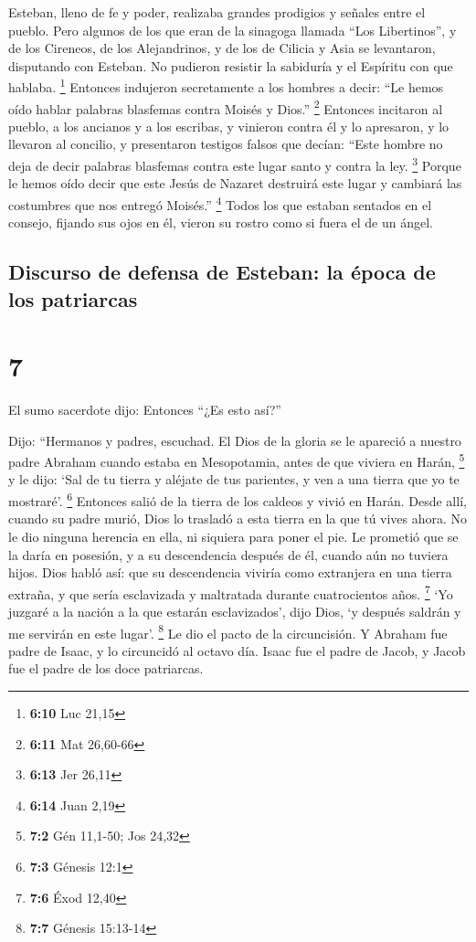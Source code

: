 Esteban, lleno de fe y poder, realizaba grandes prodigios
y señales entre el pueblo.  Pero algunos de los que eran
de la sinagoga llamada ``Los Libertinos'', y de los Cireneos, de los
Alejandrinos, y de los de Cilicia y Asia se levantaron, disputando con
Esteban.  No pudieron resistir la sabiduría y el Espíritu
con que hablaba. \footnote{\textbf{6:10} Luc 21,15} 
Entonces indujeron secretamente a los hombres a decir: ``Le hemos oído
hablar palabras blasfemas contra Moisés y Dios.'' \footnote{\textbf{6:11}
  Mat 26,60-66}  Entonces incitaron al pueblo, a los
ancianos y a los escribas, y vinieron contra él y lo apresaron, y lo
llevaron al concilio,  y presentaron testigos falsos que
decían: ``Este hombre no deja de decir palabras blasfemas contra este
lugar santo y contra la ley. \footnote{\textbf{6:13} Jer 26,11}
 Porque le hemos oído decir que este Jesús de Nazaret
destruirá este lugar y cambiará las costumbres que nos entregó Moisés.''
\footnote{\textbf{6:14} Juan 2,19}  Todos los que estaban
sentados en el consejo, fijando sus ojos en él, vieron su rostro como si
fuera el de un ángel.

\hypertarget{discurso-de-defensa-de-esteban-la-uxe9poca-de-los-patriarcas}{%
\subsection{Discurso de defensa de Esteban: la época de los
patriarcas}\label{discurso-de-defensa-de-esteban-la-uxe9poca-de-los-patriarcas}}

\hypertarget{section-6}{%
\section{7}\label{section-6}}

 El sumo sacerdote dijo: Entonces ``¿Es esto así?''

 Dijo: ``Hermanos y padres, escuchad. El Dios de la gloria
se le apareció a nuestro padre Abraham cuando estaba en Mesopotamia,
antes de que viviera en Harán, \footnote{\textbf{7:2} Gén 11,1-50; Jos
  24,32}  y le dijo: `Sal de tu tierra y aléjate de tus
parientes, y ven a una tierra que yo te mostraré'. \footnote{\textbf{7:3}
  Génesis 12:1}  Entonces salió de la tierra de los
caldeos y vivió en Harán. Desde allí, cuando su padre murió, Dios lo
trasladó a esta tierra en la que tú vives ahora.  No le
dio ninguna herencia en ella, ni siquiera para poner el pie. Le prometió
que se la daría en posesión, y a su descendencia después de él, cuando
aún no tuviera hijos.  Dios habló así: que su descendencia
viviría como extranjera en una tierra extraña, y que sería esclavizada y
maltratada durante cuatrocientos años. \footnote{\textbf{7:6} Éxod 12,40}
 `Yo juzgaré a la nación a la que estarán esclavizados',
dijo Dios, `y después saldrán y me servirán en este lugar'. \footnote{\textbf{7:7}
  Génesis 15:13-14}  Le dio el pacto de la circuncisión. Y
Abraham fue padre de Isaac, y lo circuncidó al octavo día. Isaac fue el
padre de Jacob, y Jacob fue el padre de los doce patriarcas.

